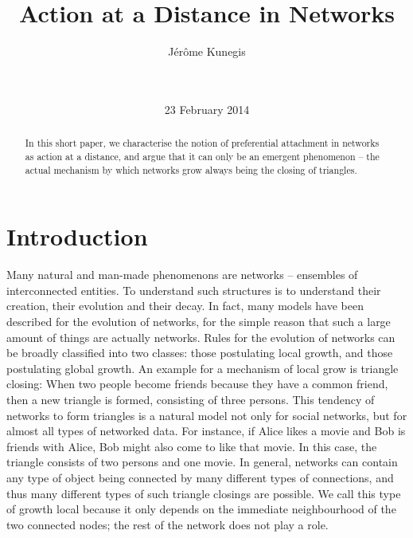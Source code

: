 \documentclass{acm_proc_article-sp}
\begin{document}
\title{ Action at a Distance in Networks }


\author{
  Jérôme Kunegis \\
   \\
  \\
}
\date{23 February 2014}

\maketitle
\begin{abstract}
In this short paper, we characterise the notion of preferential
attachment in networks as action at a distance, and argue that it can
only be an emergent phenomenon -- the actual mechanism by which networks
grow always being the closing of triangles.
\end{abstract}


\section{Introduction}
Many natural and man-made phenomenons are networks -- ensembles of
interconnected entities.  To understand such structures is to understand
their creation, their evolution and their decay.  In fact, many models
have been described for the evolution of networks, for the simple reason
that such a large amount of things are actually networks.  Rules for the
evolution of networks can be broadly classified into two classes: those
postulating local growth, and those postulating global growth.  An
example for a mechanism of local grow is triangle closing: When two
people become friends because they have a common friend, then a new
triangle is formed, consisting of three persons.  This tendency of
networks to form triangles is a natural model not only for social
networks, but for almost all types of networked data.  For instance, if
Alice likes a movie and Bob is friends with Alice, Bob might also come
to like that movie.  In this case, the triangle consists of two persons
and one movie.  In general, networks can contain any type of object
being connected by many different types of connections, and thus many
different types of such triangle closings are possible.  We call this
type of growth local because it only depends on the immediate
neighbourhood of the two connected nodes; the rest of the network does
not play a role.
\end{document}
